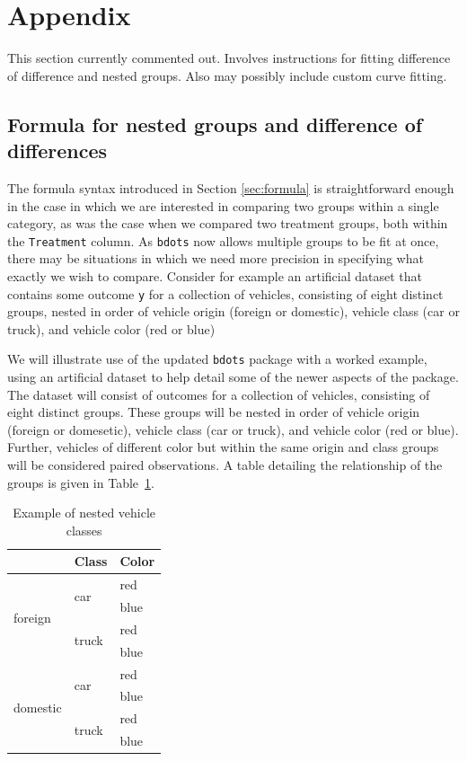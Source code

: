 \documentclass{article}
\newcommand{\xt}{\texttt}%
\begin{document}
\section{Appendix}

This section currently commented out. Involves instructions for fitting difference of difference and nested groups. Also may possibly include custom curve fitting.

%

\subsection{Formula for nested groups and difference of differences} 

The formula syntax introduced in Section \ref{sec:formula} is straightforward enough in the case in which we are interested in comparing two groups within a single category, as was the case when we compared two treatment groups, both within the \xt{Treatment} column. As \xt{bdots} now allows multiple groups to be fit at once, there may be situations in which we need more precision in specifying what exactly we wish to compare. Consider for example an artificial dataset that contains some outcome \xt{y} for a collection of vehicles, consisting of eight distinct groups, nested in order of vehicle origin (foreign or domestic), vehicle class (car or truck), and vehicle color (red or blue)

We will illustrate use of the updated \xt{bdots} package with a worked example, using an artificial dataset to help detail some of the newer aspects of the package. The dataset will consist of outcomes for a collection of vehicles, consisting of eight distinct groups. These groups will be nested in order of vehicle origin (foreign or domesetic), vehicle class (car or truck), and vehicle color (red or blue). Further, vehicles of different color but within the same origin and class groups will be considered paired observations. A table detailing the relationship of the groups is given in Table~\ref{tab:vehicle}.

\begin{table}[H]
\centering
\def\arraystretch{1.5}
\begin{tabular}{|p{0.9in}|p{0.9in}|p{0.9in}|} \hline 
\rowcolor{lightgray} \multicolumn{1}{|c|}{Origin} & \multicolumn{1}{c|}{Class} & \multicolumn{1}{c|}{Color}\\
\hline
\multirow{4}{*}{foreign} & \multirow{2}{*}{car} & red \\
\hhline{~~-}
& & blue \\
\hhline{~--}
& \multirow{2}{*}{truck} & red \\
\hhline{~~-}
& & blue \\
\hline
\multirow{4}{*}{domestic} & \multirow{2}{*}{car} & red \\
\hhline{~~-}
& & blue \\
\hhline{~--}
& \multirow{2}{*}{truck} & red \\
\hhline{~~-}
& & blue \\
\hline
\end{tabular}
\caption{Example of nested vehicle classes}
\label{tab:vehicle}
\end{table}
\end{document}
